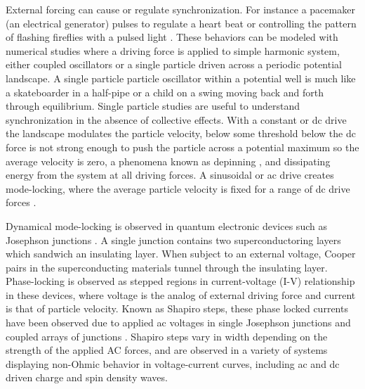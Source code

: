 \documentclass[twocolumn,preprintnumbers,amsmath,amssymb,aps,prx]{revtex4}
\begin{document}
External forcing can cause or regulate 
synchronization. %
For instance a
pacemaker (an electrical generator)
pulses to regulate a heart beat
or controlling the pattern of flashing
fireflies with a pulsed light \cite{Agrawal2013}.
These behaviors can be modeled with
numerical studies %
where
a driving force is applied to simple harmonic system,
either
coupled oscillators %
or a single particle driven across a periodic potential landscape.
A single particle particle oscillator
within a potential well is 
much like a skateboarder in a half-pipe or
a child on a swing
moving back and forth through equilibrium.  %
Single particle studies 
are useful to understand synchronization
in the absence of collective effects.
With a constant or 
dc drive the landscape modulates 
the particle velocity, below some threshold below
the dc force is not strong enough to push the particle
across a potential maximum so the average velocity is zero,
a phenomena known as depinning \cite{Reichhardt2017},
and dissipating energy from the system at all driving forces.
A sinusoidal or ac drive creates mode-locking,
where the average particle velocity
is fixed for a range of dc drive forces \cite{Reichhardt2015}.

Dynamical mode-locking
is %
observed
in quantum electronic
devices such as Josephson junctions \cite{Josephson1962,Josephson1965}.
A single junction contains 
two superconductoring layers which sandwich an insulating layer.
When subject to an external voltage,
Cooper pairs in the superconducting materials
tunnel through the insulating layer.
Phase-locking is observed as 
stepped regions in current-voltage (I-V) relationship in these devices,
where voltage is the analog of external driving force
and current is that of particle velocity.
Known as Shapiro steps, %
these phase locked currents  
have been observed due to applied ac voltages in 
single Josephson junctions \cite{Shapiro1963, Golubov2004} and
coupled arrays of junctions \cite{Benz1990}.
Shapiro steps vary in width depending on the strength of the
applied AC forces,
and are observed in a variety of systems
displaying
non-Ohmic behavior in voltage-current curves,
including
ac and dc driven
charge and spin density waves.
\end{document}
